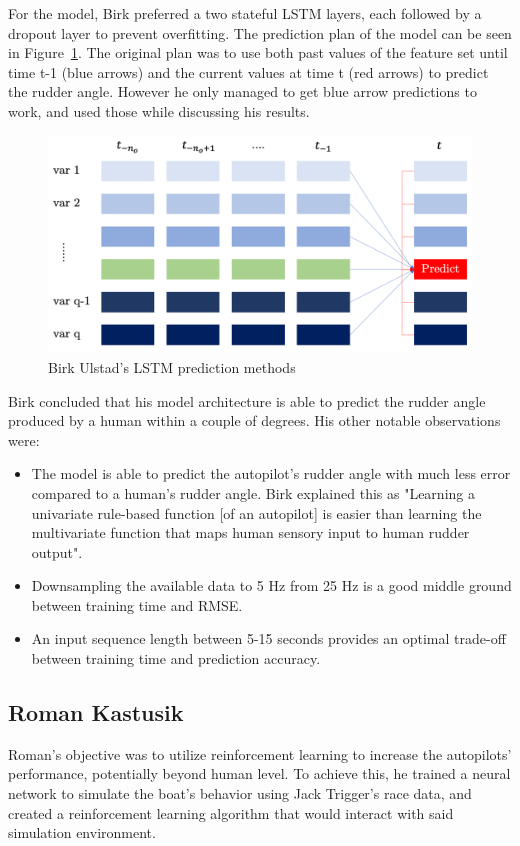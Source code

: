 \documentclass[12pt,twoside]{report}
\begin{document}
For the model, Birk preferred a two stateful LSTM layers, each followed by a dropout layer to prevent overfitting. The prediction plan of the model can be seen in Figure~\ref{fig:birk lstm}. The original plan was to use both past values of the feature set until time t-1 (blue arrows) and the current values at time t (red arrows) to predict the rudder angle. However he only managed to get blue arrow predictions to work, and used those while discussing his results.

\begin{figure}[h]
\centering
\includegraphics[width = 0.7\hsize]{figures/Birk Ulstad LSTM prediction.png}
\caption{Birk Ulstad's LSTM prediction methods}
\label{fig:birk lstm}
\end{figure}

Birk concluded that his model architecture is able to predict the rudder angle produced by a human within a couple of degrees. His other notable observations were: 
\begin{itemize}
  \item The model is able to predict the autopilot's rudder angle with much less error compared to a human's rudder angle. Birk explained this as "Learning a univariate rule-based function [of an autopilot] is easier than learning the multivariate function that maps human sensory input to human rudder output".
  \item Downsampling the available data to 5 Hz from 25 Hz is a good middle ground between training time and RMSE. 
  \item An input sequence length between 5-15 seconds provides an optimal trade-off between training time and prediction accuracy.
\end{itemize} 

\subsection{Roman Kastusik}
Roman's objective was to utilize reinforcement learning to increase the autopilots' performance, potentially beyond human level. To achieve this, he trained a neural network to simulate the boat's behavior using Jack Trigger's race data, and created a reinforcement learning algorithm that would interact with said simulation environment. \cite{roman}
\end{document}
